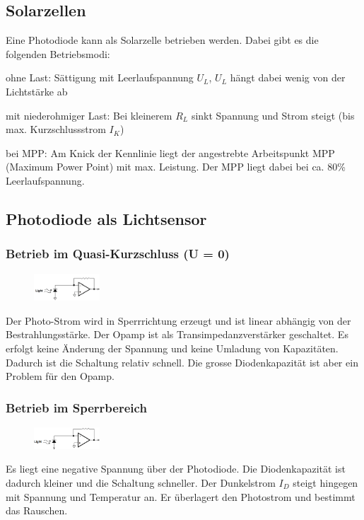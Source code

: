 \subsection{Solarzellen}
Eine Photodiode kann als Solarzelle betrieben werden. Dabei gibt es die folgenden Betriebsmodi:
\begin{compactitem}
    \item ohne Last: Sättigung mit Leerlaufspannung $U_L$, $U_L$ hängt dabei wenig von der Lichtstärke ab
    \item mit niederohmiger Last: Bei kleinerem $R_L$ sinkt Spannung und Strom steigt (bis max. Kurzschlussstrom $I_K$)
    \item bei MPP: Am Knick der Kennlinie liegt der angestrebte Arbeitspunkt MPP (Maximum Power Point) mit max. Leistung. Der MPP liegt dabei bei ca. 80\% Leerlaufspannung.
\end{compactitem}

\subsection{Photodiode als Lichtsensor}
\subsubsection{Betrieb im Quasi-Kurzschluss (U = 0)}
\begin{figure}
    \centering
    \includegraphics[width=0.22\textwidth]{images/photodiode_betrieb_01}
\end{figure}
Der Photo-Strom wird in Sperrrichtung erzeugt und ist linear abhängig von der Bestrahlungsstärke. Der Opamp ist als Transimpedanzverstärker geschaltet. Es erfolgt keine Änderung der Spannung und keine Umladung von Kapazitäten. Dadurch ist die Schaltung relativ schnell. Die grosse Diodenkapazität ist aber ein Problem für den Opamp. 

\subsubsection{Betrieb im Sperrbereich}
\begin{figure}
    \centering
    \includegraphics[width=0.22\textwidth]{images/photodiode_betrieb_02}
\end{figure}
Es liegt eine negative Spannung über der Photodiode. Die Diodenkapazität ist dadurch kleiner und die Schaltung schneller. Der Dunkelstrom $I_D$ steigt hingegen mit Spannung und Temperatur an. Er überlagert den Photostrom und bestimmt das Rauschen.

